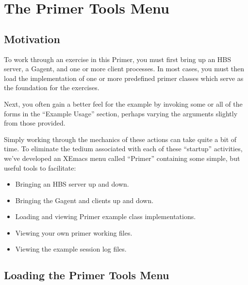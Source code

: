 
\section{The Primer Tools Menu}
\label{sec:primer-tools}

\subsection{Motivation}
To work through an exercise in this Primer, you must first bring up an HBS
server, a Gagent, and one or more client processes.  In most cases, you
must then load the implementation of one or more predefined primer classes
which serve as the foundation for the exercises.

Next, you often gain a better feel for the example by invoking some or all
of the forms in the ``Example Usage'' section, perhaps varying the
arguments slightly from those provided. 

Simply working through the mechanics of these actions can take quite a bit
of time.  To eliminate the tedium associated with each of these ``startup''
activities, we've developed an XEmacs menu called ``Primer'' containing
some simple, but useful tools to facilitate:
\begin{itemize}
\item Bringing an HBS server up and down.
\item Bringing the Gagent and clients up and down.
\item Loading and viewing Primer example class implementations.
\item Viewing your own primer working files.
\item Viewing the example session log files. 
\end{itemize}

\subsection{Loading the Primer Tools Menu}

